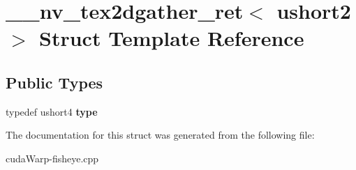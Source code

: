 \hypertarget{struct____nv__tex2dgather__ret_3_01ushort2_01_4}{}\section{\+\_\+\+\_\+nv\+\_\+tex2dgather\+\_\+ret$<$ ushort2 $>$ Struct Template Reference}
\label{struct____nv__tex2dgather__ret_3_01ushort2_01_4}
\subsection*{Public Types}
\begin{DoxyCompactItemize}
\item 
typedef ushort4 {\bfseries type}\hypertarget{struct____nv__tex2dgather__ret_3_01ushort2_01_4_a25d6af91bd7c84feafda1a0da4331dd3}{}\label{struct____nv__tex2dgather__ret_3_01ushort2_01_4_a25d6af91bd7c84feafda1a0da4331dd3}

\end{DoxyCompactItemize}


The documentation for this struct was generated from the following file\+:\begin{DoxyCompactItemize}
\item 
cuda\+Warp-\/fisheye.\+cpp\end{DoxyCompactItemize}
